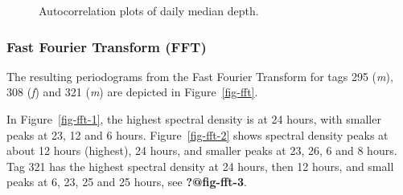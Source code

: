 \documentclass[
  authoryear,
  review,
  3p]{elsarticle}
\begin{document}
\begin{figure}

\begin{minipage}[t]{\linewidth}

{\centering 


}

\end{minipage}%
\newline
\begin{minipage}[t]{\linewidth}

{\centering 


}

\end{minipage}%

\caption{\label{fig-acf}Autocorrelation plots of daily median depth.}

\end{figure}

\hypertarget{fast-fourier-transform-fft}{%
\subsubsection{Fast Fourier Transform
(FFT)}\label{fast-fourier-transform-fft}}

The resulting periodograms from the Fast Fourier Transform for tags 295
(\emph{m}), 308 (\emph{f}) and 321 (\emph{m}) are depicted in
Figure~\ref{fig-fft}.

In Figure~\ref{fig-fft-1}, the highest spectral density is at 24 hours,
with smaller peaks at 23, 12 and 6 hours. Figure~\ref{fig-fft-2} shows
spectral density peaks at about 12 hours (highest), 24 hours, and
smaller peaks at 23, 26, 6 and 8 hours. Tag 321 has the highest spectral
density at 24 hours, then 12 hours, and small peaks at 6, 23, 25 and 25
hours, see \textbf{?@fig-fft-3}.
\end{document}
